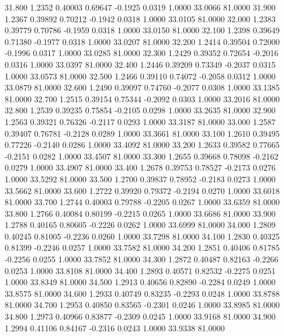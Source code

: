   31.800   1.2352   0.40003   0.69647  -0.1925   0.0319   1.0000  33.0066  81.0000
  31.900   1.2367   0.39892   0.70212  -0.1942   0.0318   1.0000  33.0105  81.0000
  32.000   1.2383   0.39779   0.70786  -0.1959   0.0318   1.0000  33.0150  81.0000
  32.100   1.2398   0.39649   0.71380  -0.1977   0.0318   1.0000  33.0207  81.0000
  32.200   1.2414   0.39504   0.72000  -0.1996   0.0317   1.0000  33.0285  81.0000
  32.300   1.2429   0.39352   0.72654  -0.2016   0.0316   1.0000  33.0397  81.0000
  32.400   1.2446   0.39209   0.73349  -0.2037   0.0315   1.0000  33.0573  81.0000
  32.500   1.2466   0.39110   0.74072  -0.2058   0.0312   1.0000  33.0879  81.0000
  32.600   1.2490   0.39097   0.74760  -0.2077   0.0308   1.0000  33.1385  81.0000
  32.700   1.2515   0.39154   0.75344  -0.2092   0.0303   1.0000  33.2016  81.0000
  32.800   1.2539   0.39235   0.75854  -0.2105   0.0298   1.0000  33.2635  81.0000
  32.900   1.2563   0.39321   0.76326  -0.2117   0.0293   1.0000  33.3187  81.0000
  33.000   1.2587   0.39407   0.76781  -0.2128   0.0289   1.0000  33.3661  81.0000
  33.100   1.2610   0.39495   0.77226  -0.2140   0.0286   1.0000  33.4092  81.0000
  33.200   1.2633   0.39582   0.77665  -0.2151   0.0282   1.0000  33.4507  81.0000
  33.300   1.2655   0.39668   0.78098  -0.2162   0.0279   1.0000  33.4907  81.0000
  33.400   1.2678   0.39753   0.78527  -0.2173   0.0276   1.0000  33.5292  81.0000
  33.500   1.2700   0.39837   0.78952  -0.2183   0.0273   1.0000  33.5662  81.0000
  33.600   1.2722   0.39920   0.79372  -0.2194   0.0270   1.0000  33.6018  81.0000
  33.700   1.2744   0.40003   0.79788  -0.2205   0.0267   1.0000  33.6359  81.0000
  33.800   1.2766   0.40084   0.80199  -0.2215   0.0265   1.0000  33.6686  81.0000
  33.900   1.2788   0.40165   0.80605  -0.2226   0.0262   1.0000  33.6999  81.0000
  34.000   1.2809   0.40245   0.81005  -0.2236   0.0260   1.0000  33.7298  81.0000
  34.100   1.2830   0.40325   0.81399  -0.2246   0.0257   1.0000  33.7582  81.0000
  34.200   1.2851   0.40406   0.81785  -0.2256   0.0255   1.0000  33.7852  81.0000
  34.300   1.2872   0.40487   0.82163  -0.2266   0.0253   1.0000  33.8108  81.0000
  34.400   1.2893   0.40571   0.82532  -0.2275   0.0251   1.0000  33.8349  81.0000
  34.500   1.2913   0.40656   0.82890  -0.2284   0.0249   1.0000  33.8575  81.0000
  34.600   1.2933   0.40749   0.83235  -0.2293   0.0248   1.0000  33.8788  81.0000
  34.700   1.2953   0.40850   0.83565  -0.2301   0.0246   1.0000  33.8985  81.0000
  34.800   1.2973   0.40966   0.83877  -0.2309   0.0245   1.0000  33.9168  81.0000
  34.900   1.2994   0.41106   0.84167  -0.2316   0.0243   1.0000  33.9338  81.0000
